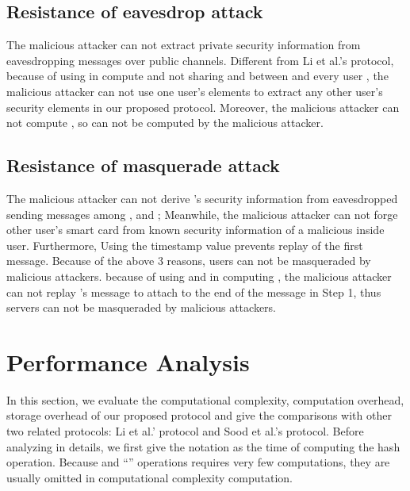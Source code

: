 \documentclass[preprint,12pt]{elsarticle}
\begin{document}
\subsection{Resistance of eavesdrop attack}
The malicious attacker can not extract private security information from eavesdropping messages over public channels. Different from Li et al.'s protocol, because of using  in compute  and not sharing  and  between  and every user , the malicious attacker can not use one user's elements to extract any other user's security elements in our proposed protocol. Moreover, the malicious attacker can not compute , so  can not be computed by the malicious attacker.

\subsection{Resistance of masquerade attack}
The malicious attacker can not derive 's security information from eavesdropped sending messages among ,  and ; Meanwhile, the malicious attacker can not forge other user's smart card from known security information of a malicious inside user. Furthermore, Using the timestamp value prevents replay of the first message. Because of the above 3 reasons, users can not be masqueraded by malicious attackers. because of using  and  in computing , the malicious attacker can not replay 's message to attach to  the end of the message in Step 1, thus servers can not be masqueraded by malicious attackers.


\section{Performance Analysis}
In this section, we evaluate the computational complexity, computation overhead, storage overhead of our proposed protocol and give the comparisons with other two related protocols: Li et al.' protocol\cite{passwd-based-multi7} and Sood et al.'s protocol\cite{passwd-based-multi2}. Before analyzing in details, we first give the notation  as the time of computing the hash operation. Because  and ``'' operations requires very few computations, they are usually omitted in computational complexity computation.
\begin{table}[h]
\centering
\caption{Computational complexity comparison of our protocol and two other related protocols}
\end{table}
\end{document}
